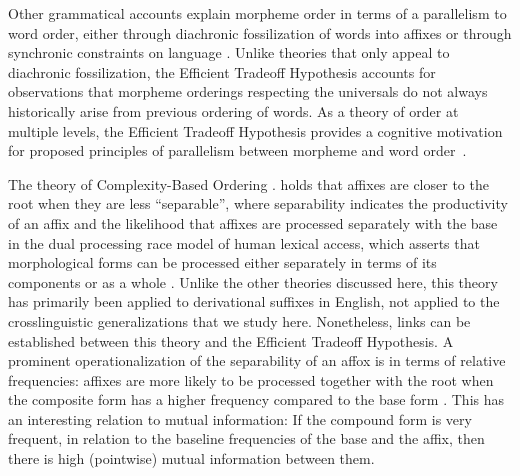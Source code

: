 \documentclass[11pt,letterpaper]{article}
\newcommand{\citep}{\parencite}
\newcommand{\citet}{\Textcite}
\newcommand\mhahn[1]{{\color{red}(#1)}}
\begin{document}





Other grammatical accounts explain morpheme order in terms of a parallelism to word order, either through diachronic fossilization of words into affixes or through synchronic constraints on language \citep{givon1971historical,venneman1973explanation,baker1985the}.
Unlike theories that only appeal to diachronic fossilization, the Efficient Tradeoff Hypothesis accounts for observations that morpheme orderings respecting the universals do not always historically arise from previous ordering of words.
As a theory of order at multiple levels, the Efficient Tradeoff Hypothesis  provides a cognitive motivation for proposed principles of parallelism between morpheme and word order~\citep{baker1985the}.



The theory of Complexity-Based Ordering \citep{hay2002speech,plag2002the,hay2004what,hay2005shifting,plag2009suffix}.
holds that affixes are closer to the root when they are less ``separable'', where separability indicates the productivity of an affix and the likelihood that affixes are processed separately with the base in the dual processing race model of human lexical access, which asserts that morphological forms can be processed either separately in terms of its components or as a whole  \citep{baayen1993on}.
Unlike the other theories discussed here, this theory has primarily been applied to derivational suffixes in English, not applied to the crosslinguistic generalizations that we study here.
Nonetheless, links can be established between this theory and the Efficient Tradeoff Hypothesis.
A prominent operationalization of the separability of an affox is in terms of relative frequencies:
affixes are more likely to be processed together with the root when the composite form has a higher frequency compared to the base form \citep{hay2001lexical}. %
This has an interesting relation to mutual information: 
If the compound form is very frequent, in relation to the baseline frequencies of the base and the affix, then there is high (pointwise) mutual information between them.
\end{document}
